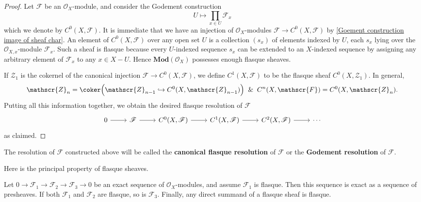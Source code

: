 \begin{proof}
Let $\mathscr{F}$ be an $\mathscr{O}_X$-module, and consider the Godement construction
\[U\mapsto\prod_{x\in U}\mathscr{F}_x\]
which we denote by $C^0(X,\mathscr{F})$. It is immediate that we have an injection of $\mathscr{O}_X$-modules $\mathscr{F}\to C^0(X,\mathscr{F})$ by \cref{Goement construction image of sheaf char}. An element of $C^0(X,\mathscr{F})$ over any open set $U$ is a collection $(s_x)$ of elements indexed by $U$, each $s_x$ lying over the $\mathscr{O}_{X,x}$-module $\mathscr{F}_x$. Such a sheaf is flasque because every $U$-indexed sequence $s_x$ can be extended to an $X$-indexed sequence by assigning any arbitrary element of $\mathscr{F}_x$ to any $x\in X-U$. Hence $\mathbf{Mod}(\mathscr{O}_X)$ possesses enough flasque sheaves.\par
If $\mathscr{Z}_1$ is the cokernel of the canonical injection $\mathscr{F}\to C^0(X,\mathscr{F})$, we define $C^1(X,\mathscr{F})$ to be the flasque sheaf $C^0(X,\mathscr{Z}_1)$. In general, 
\[\mathscr{Z}_n=\coker\Big(\mathscr{Z}_{n-1}\hookrightarrow C^0(X,\mathscr{Z}_{n-1})\Big)\And C^n(X,\mathscr{F})=C^0(X,\mathscr{Z}_n).\] Putting all this information together, we obtain the desired flasque resolution of $\mathscr{F}$
\[\begin{tikzcd}
0\ar[r]&\mathscr{F}\ar[r]&C^0(X,\mathscr{F})\ar[r]&C^1(X,\mathscr{F})\ar[r]&C^2(X,\mathscr{F})\ar[r]&\cdots
\end{tikzcd}\]
as claimed.
\end{proof}
\begin{remark}
The resolution of $\mathscr{F}$ constructed above will be called the \textbf{canonical flasque resolution} of $\mathscr{F}$ or the \textbf{Godement resolution} of $\mathscr{F}$.
\end{remark}
Here is the principal property of flasque sheaves.
\begin{theorem}\label{flasque sheaf prop}
Let $0\to\mathscr{F}_1\to\mathscr{F}_2\to\mathscr{F}_3\to 0$ be an exact sequence of $\mathscr{O}_X$-modules, and assume $\mathscr{F}_1$ is flasque. Then this sequence is exact as a sequence of presheaves. If both $\mathscr{F}_1$ and $\mathscr{F}_2$ are flasque, so is $\mathscr{F}_3$. Finally, any direct summand of a flasque sheaf is flasque.
\end{theorem}

